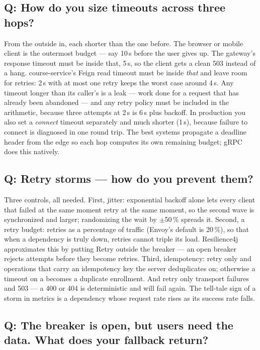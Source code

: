 \subsection*{Q: How do you size timeouts across three hops?}

From the outside in, each shorter than the one before. The browser or
mobile client is the outermost budget --- say 10\,s before the user
gives up. The gateway's response timeout must be inside that, 5\,s,
so the client gets a clean 503 instead of a hang. course-service's
Feign read timeout must be inside \emph{that} and leave room for
retries: 2\,s with at most one retry keeps the worst case around 4\,s.
Any timeout longer than its caller's is a leak --- work done for a
request that has already been abandoned --- and any retry policy must
be included in the arithmetic, because three attempts at 2\,s is 6\,s
plus backoff. In production you also set a \emph{connect} timeout
separately and much shorter (1\,s), because failure to connect is
diagnosed in one round trip. The best systems propagate a deadline
header from the edge so each hop computes its own remaining budget;
gRPC does this natively.

\subsection*{Q: Retry storms --- how do you prevent them?}

Three controls, all needed. First, jitter: exponential backoff alone
lets every client that failed at the same moment retry at the same
moment, so the second wave is synchronized and larger; randomizing the
wait by $\pm$50\,\% spreads it. Second, a retry budget: retries as a
percentage of traffic (Envoy's default is 20\,\%), so that when a
dependency is truly down, retries cannot triple its load. Resilience4j
approximates this by putting Retry outside the breaker --- an open
breaker rejects attempts before they become retries. Third,
idempotency: retry only  and operations that carry an
idempotency key the server deduplicates on; otherwise a timeout on a
 becomes a duplicate enrollment. And retry only transport
failures and 503 --- a 400 or 404 is deterministic and will fail again.
The tell-tale sign of a storm in metrics is a dependency whose request
rate rises as its success rate falls.

\subsection*{Q: The breaker is open, but users need the data. What does your fallback return?}

